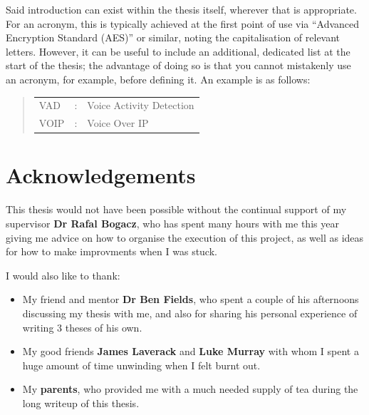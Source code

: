 \documentclass[ %
                    author={Sam Phippen},
                supervisor={Dr. Rafal Bogacz},
                     title={Real time voice activity detectors in noisy personal computing environments},
                  subtitle={},
                    degree={MEng},
                      year={2012} ]{thesis}
\begin{document}
Said introduction can exist within the thesis itself, wherever that is
appropriate.  For an acronym, this is typically achieved at the first point 
of use via ``Advanced Encryption Standard (AES)'' or similar, noting the 
capitalisation of relevant letters.  However, it can be useful to include 
an additional, dedicated list at the start of the thesis; the advantage of 
doing so is that you cannot mistakenly use an acronym, for example, 
before defining it.  An example is as follows:

\begin{quote}
\noindent
\begin{tabular}{lcl}
VAD                 &:     & Voice Activity Detection                 \\
VOIP                &:     & Voice Over IP\\
\end{tabular}
\end{quote}


\chapter*{Acknowledgements}

\vspace{1cm}

This thesis would not have been possible without the continual support of my
supervisor {\bf Dr Rafal Bogacz}, who has spent many hours with me this year giving
me advice on how to organise the execution of this project, as well as ideas
for how to make improvments when I was stuck.

I would also like to thank:
\begin{itemize}

    \item My friend and mentor {\bf Dr Ben Fields}, who spent a couple of his
        afternoons discussing my thesis with me, and also for sharing his
        personal experience of writing 3 theses of his own.

    \item My good friends {\bf James Laverack} and {\bf Luke Murray} with whom I spent a
        huge amount of time unwinding when I felt burnt out.

    \item My {\bf parents}, who provided me with a much needed supply of tea during
        the long writeup of this thesis.

\end{itemize}
\end{document}
